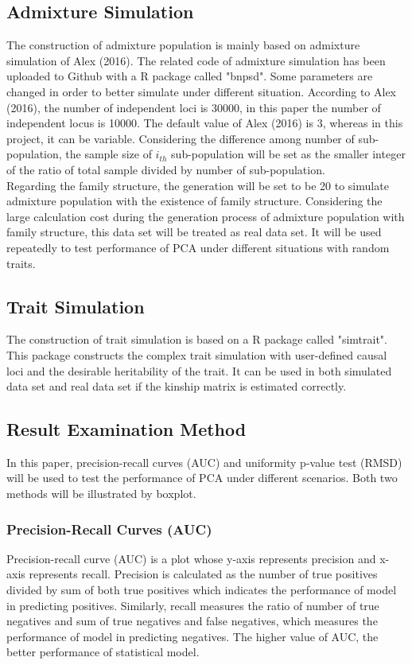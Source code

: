 \documentclass[12pt]{article}
\theoremstyle{definition}
\theoremstyle{plain}
\begin{document}
\subsection{Admixture Simulation}
The construction of admixture population is mainly based on admixture simulation of Alex (2016). The related code of admixture simulation has been uploaded to Github with a R package called "bnpsd".  Some parameters are changed in order to better simulate under different situation. According to Alex (2016), the number of independent loci is 30000, in this paper the number of independent locus is 10000. The default value of Alex (2016) is 3, whereas in this project, it can be variable. Considering the difference among number of sub-population, the sample size of $i_{th}$ sub-population will be set as the smaller integer of the ratio of total sample divided by number of sub-population.\\
Regarding the family structure, the generation will be set to be 20 to simulate admixture population with the existence of family structure. Considering the large calculation cost during the generation process of admixture population with family structure, this data set will be treated as real data set. It will be used repeatedly to test performance of PCA under different situations with random traits.



\subsection{Trait Simulation}
The construction of trait simulation is based on a R package called "simtrait". This package constructs the complex trait simulation with user-defined causal loci and the desirable heritability of the trait. It can be used in both simulated data set and real data set if the kinship matrix is estimated correctly. \\


\subsection{Result Examination Method}
In this paper, precision-recall curves (AUC) and uniformity p-value test (RMSD) will be used to test the performance of PCA under different scenarios. Both two methods will be illustrated by boxplot.
\subsubsection{Precision-Recall Curves (AUC)}
Precision-recall curve (AUC) is a plot whose y-axis represents precision and x-axis represents recall. Precision is calculated as the number of true positives divided by sum of both true positives which indicates the performance of model in predicting positives. Similarly, recall measures the ratio of number of true negatives and sum of true negatives and false negatives, which measures the performance of model in predicting negatives. The higher value of AUC, the better performance of statistical model.
\end{document}
